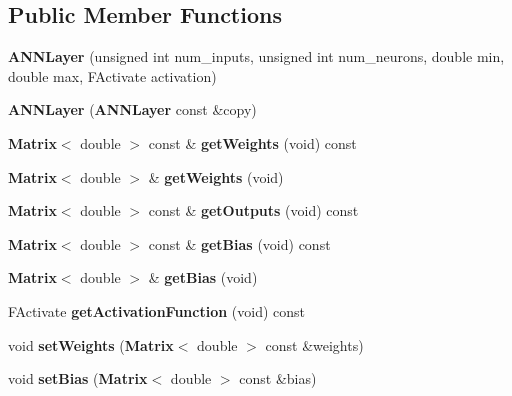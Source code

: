\subsection*{Public Member Functions}
\begin{DoxyCompactItemize}
\item 
{\bfseries A\+N\+N\+Layer} (unsigned int num\+\_\+inputs, unsigned int num\+\_\+neurons, double min, double max, F\+Activate activation)\label{class_g_a_n_n_1_1_a_n_n_layer_a98a15401495eddad363a75c2ab9c5773}

\item 
{\bfseries A\+N\+N\+Layer} ({\bf A\+N\+N\+Layer} const \&copy)\label{class_g_a_n_n_1_1_a_n_n_layer_a89236bd33096986ab0efa417d4cbcb1c}

\item 
{\bf Matrix}$<$ double $>$ const \& {\bfseries get\+Weights} (void) const \label{class_g_a_n_n_1_1_a_n_n_layer_a53907cae383f48d74ec7377665d99748}

\item 
{\bf Matrix}$<$ double $>$ \& {\bfseries get\+Weights} (void)\label{class_g_a_n_n_1_1_a_n_n_layer_ae91b6f9960dfea801080512dc5d9b224}

\item 
{\bf Matrix}$<$ double $>$ const \& {\bfseries get\+Outputs} (void) const \label{class_g_a_n_n_1_1_a_n_n_layer_a73e68bd212308c07f0e189cac0ce1f78}

\item 
{\bf Matrix}$<$ double $>$ const \& {\bfseries get\+Bias} (void) const \label{class_g_a_n_n_1_1_a_n_n_layer_a667dafc7ab40773bbd6bc32553bd4cb0}

\item 
{\bf Matrix}$<$ double $>$ \& {\bfseries get\+Bias} (void)\label{class_g_a_n_n_1_1_a_n_n_layer_a35de727d75d940dd9614ecdf0f1327ca}

\item 
F\+Activate {\bfseries get\+Activation\+Function} (void) const \label{class_g_a_n_n_1_1_a_n_n_layer_ac6177070fe7bb18aeed82980b70894e1}

\item 
void {\bfseries set\+Weights} ({\bf Matrix}$<$ double $>$ const \&weights)\label{class_g_a_n_n_1_1_a_n_n_layer_a99b44245e660160e6431f4bd8b7cf8ed}

\item 
void {\bfseries set\+Bias} ({\bf Matrix}$<$ double $>$ const \&bias)\label{class_g_a_n_n_1_1_a_n_n_layer_a33b17fa33318cc5ab3060025ccf90faf}


\end{DoxyCompactItemize}
